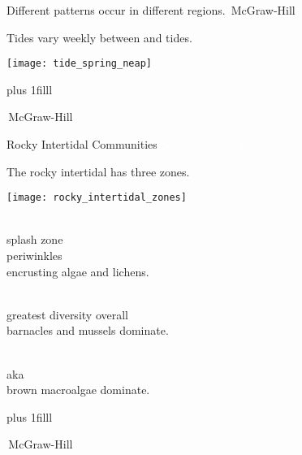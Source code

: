 \documentclass[t]{beamer}
\begin{document}
{
\begin{frame}[b]{Different patterns occur in different regions.}
\hfill\tiny\textcopyright\,McGraw-Hill
\end{frame}
}

\begin{frame}[t]{Tides vary weekly between  and  tides.}

	\vspace*{-\baselineskip}

	\begin{center}
		\texttt{[image: tide\_spring\_neap]} 
	\end{center}

\vskip0pt plus 1filll

\tiny\textcopyright\,McGraw-Hill

\end{frame}


{
\begin{frame}[b]{Rocky Intertidal Communities}
\tiny\textcolor{white}{Source unknown.}
\end{frame}
}


\begin{frame}[t]{The rocky intertidal has three zones.}

\vspace*{-\baselineskip}

\begin{multicols}{2}

	\begin{center}
		\texttt{[image: rocky\_intertidal\_zones]}
	\end{center}

\columnbreak

	\hangpara{}\\
	\hspace*{1em}splash zone\\
	\hspace*{1em}periwinkles\\
	\hspace*{1em}encrusting algae and lichens.
	

	\hangpara{}\\
	\hspace*{1em}greatest diversity overall\\
	\hspace*{1em}barnacles and mussels dominate.

	\hangpara{}\\
	\hspace*{1em}aka \\
	\hspace*{1em}brown macroalgae dominate.

\end{multicols}

	\vskip0pt plus 1filll

	\tiny\textcopyright\,McGraw-Hill

\end{frame}
\end{document}
